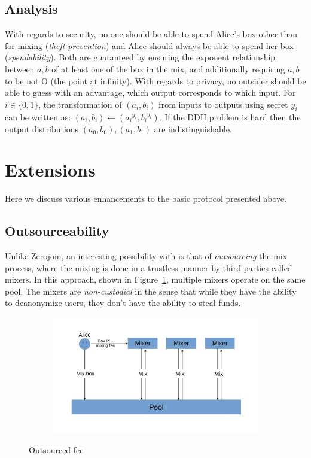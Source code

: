 \documentclass[runningheads]{llncs}
\newcommand{\zerojoin}{Zerojoin\xspace}
\begin{document}
\subsection{Analysis}

With regards to security, no one should be able to spend Alice's box other than for mixing ({\em theft-prevention}) and Alice should always be able to spend her box ({\em spendability}). Both are guaranteed by ensuring the exponent relationship between $a, b$ of at least one of the box in the mix, and additionally requiring $a, b$ to be not O (the point at infinity). With regards to privacy, no outsider should be able to guess with an advantage, which output corresponds to which input. For $i \in \{0, 1\}$, the transformation of $(a_i, b_i)$ from inputs to outputs using secret $y_i$ can be written as:
$(a_i, b_i) \leftarrow ({a_i}^{y_i}, {b_i}^{y_i})$. If the DDH problem is hard then the output distributions $(a_0, b_0), (a_1, b_1)$ are indistinguishable.

\section{Extensions}

Here we discuss various enhancements to the basic protocol presented above.

\subsection{Outsourceability}

Unlike \zerojoin, an interesting possibility with \algname is that of {\em outsourcing} the mix process, where the mixing is done in a trustless manner by third parties called mixers. In this approach, shown in Figure~\ref{fig:joiner}, multiple mixers operate on the same pool. The mixers are {\em non-custodial} in the sense that while they have the ability to deanonymize users, they don't have the ability to steal funds.


\begin{figure}[ht]
\centering
\begin{subfigure}{0.8\textwidth}
\centering
\includegraphics[width=\linewidth]{Joiner.jpg}
\end{subfigure}%
\caption{Outsourced fee}
\label{fig:joiner}
\end{figure}
\end{document}
